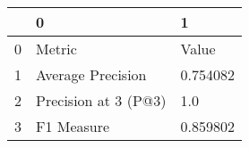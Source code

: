 \begin{tabular}{lll}
\toprule
{} &                     0 &         1 \\
\midrule
0 &                Metric &     Value \\
1 &     Average Precision &  0.754082 \\
2 &  Precision at 3 (P@3) &       1.0 \\
3 &            F1 Measure &  0.859802 \\
\bottomrule
\end{tabular}
